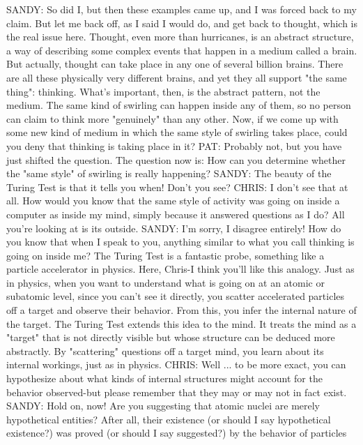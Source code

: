 SANDY: So did I, but then these examples came up, and I was forced back to my
   claim. But let me back off, as I said I would do, and get back to thought, which is
   the real issue here. Thought, even more than hurricanes, is an abstract structure, a
   way of describing some complex events that happen in a medium called a brain.
   But actually, thought can take place in any one of several billion brains. There
   are all these physically very different brains, and yet they all support "the same
   thing": thinking. What's important, then, is the abstract pattern, not the medium.
   The same kind of swirling can happen inside any of them, so no person can claim
   to think more "genuinely" than any other. Now, if we come up with some new
   kind of medium in which the same style of swirling takes place, could you deny
   that thinking is taking place in it?
PAT: Probably not, but you have just shifted the question. The question now is: How
   can you determine whether the "same style" of swirling is really happening?
SANDY: The beauty of the Turing Test is that it tells you when! Don't you see?
CHRIS: I don't see that at all. How would you know that the same style of activity
   was going on inside a computer as inside my mind, simply because it answered
   questions as I do? All you're looking at is its outside.
SANDY: I'm sorry, I disagree entirely! How do you know that when I speak to you,
   anything similar to what you call thinking is going on inside me? The Turing
   Test is a fantastic probe, something like a particle accelerator in physics. Here,
   Chris-I think you'll like this analogy. Just as in physics, when you want to
   understand what is going on at an atomic or subatomic level, since you can't see
   it directly, you scatter accelerated particles off a target and observe their
   behavior. From this, you infer the internal nature of the target. The Turing Test
   extends this idea to the mind. It treats the mind as a "target" that is not directly
   visible but whose structure can be deduced more abstractly. By "scattering"
   questions off a target mind, you learn about its internal workings, just as in
   physics.
CHRIS: Well ... to be more exact, you can hypothesize about what kinds of internal
   structures might account for the behavior observed-but please remember that they
   may or may not in fact exist.
SANDY: Hold on, now! Are you suggesting that atomic nuclei are merely
   hypothetical entities? After all, their existence (or should I say hypothetical
   existence?) was proved (or should I say suggested?) by the behavior of particles
